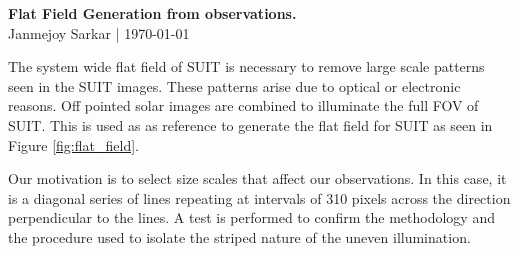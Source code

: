 \documentclass[11pt,a4paper]{article}
\begin{document}
\begin{center}
		\Large \textbf{Flat Field Generation from observations.}\\
		\normalsize Janmejoy Sarkar | \today
\end{center}
	The system wide flat field of SUIT is necessary to remove large scale patterns seen in the SUIT images. These patterns 	arise due to optical or electronic reasons. Off pointed solar images are combined to illuminate the full FOV of SUIT. This is used as as reference to generate the flat field for SUIT as seen in Figure \ref{fig:flat_field}. 
	
	Our motivation is to select size scales that affect our observations. In this case, it is a diagonal series of lines repeating at intervals of 310 pixels across the direction perpendicular to the lines. A test is performed to confirm the methodology and the procedure used to isolate the striped nature of the uneven illumination.
	
\end{document}
